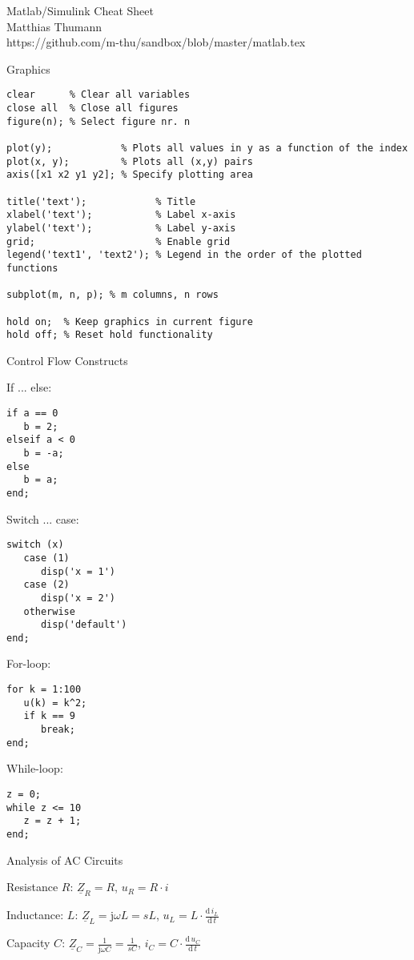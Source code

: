 \documentclass[a4paper,fontsize=11pt,parskip]{scrartcl}
\begin{document}
{\Huge Matlab/Simulink Cheat Sheet}\\
{\large Matthias Thumann}\\
{\large https://github.com/m-thu/sandbox/blob/master/matlab.tex}


{\Large Graphics}


\begin{lstlisting}
clear      % Clear all variables
close all  % Close all figures
figure(n); % Select figure nr. n

plot(y);            % Plots all values in y as a function of the index
plot(x, y);         % Plots all (x,y) pairs
axis([x1 x2 y1 y2]; % Specify plotting area

title('text');            % Title
xlabel('text');           % Label x-axis
ylabel('text');           % Label y-axis
grid;                     % Enable grid
legend('text1', 'text2'); % Legend in the order of the plotted functions

subplot(m, n, p); % m columns, n rows

hold on;  % Keep graphics in current figure
hold off; % Reset hold functionality
\end{lstlisting}


{\Large Control Flow Constructs}

If ... else:
\begin{lstlisting}
if a == 0
   b = 2;
elseif a < 0
   b = -a;
else
   b = a;
end;
\end{lstlisting}

Switch ... case:
\begin{lstlisting}
switch (x)
   case (1)
      disp('x = 1')
   case (2)
      disp('x = 2')
   otherwise
      disp('default')
end;
\end{lstlisting}

For-loop:
\begin{lstlisting}
for k = 1:100
   u(k) = k^2;
   if k == 9
      break;
end;
\end{lstlisting}

While-loop:
\begin{lstlisting}
z = 0;
while z <= 10
   z = z + 1;
end;
\end{lstlisting}

{\Large Analysis of AC Circuits}

Resistance $R$: $\underline Z_R = R$, $u_R = R\cdot i$

Inductance: $L$: $\underline Z_L = \mathrm{j}\omega L=sL$, $u_L = L\cdot\frac{\mathrm{d}\,i_L}{\mathrm{d}\,t}$

Capacity $C$: $\underline Z_C = \frac{1}{\mathrm{j}\omega C}=\frac{1}{sC}$, $i_C = C\cdot\frac{\mathrm{d}\,u_C}{\mathrm{d}\,t}$
\end{document}
